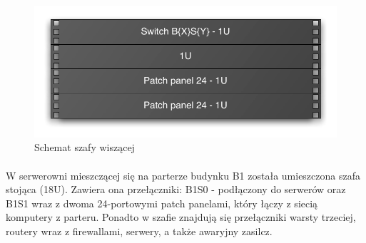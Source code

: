 \begin{figure}[H]
  \begin{center}
    \includegraphics[width=\textwidth]{img/s/szafa-mala.pdf}
    \caption{Schemat szafy wiszącej}
  \end{center}
\end{figure}

\paragraph{}
W serwerowni mieszczącej się na parterze budynku B1 została umieszczona szafa stojąca (18U).
Zawiera ona przełączniki: B1S0 - podłączony do serwerów oraz B1S1 wraz z dwoma 24-portowymi patch panelami, który łączy z siecią komputery z parteru.
Ponadto w szafie znajdują się przełączniki warsty trzeciej, routery wraz z firewallami, serwery, a także awaryjny zasilcz.


